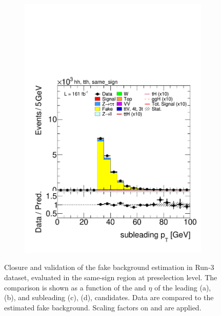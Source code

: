 \begin{figure}[htbp]
\begin{subfigure}[b]{0.45\textwidth}
      \includegraphics[width=\textwidth]{images/fakes_run3/plot_tau_1_pt_hh_tth_22_23_24_same_sign.pdf}
      \caption{}
    \end{subfigure}
  
    \caption{
      Closure and validation of the fake background estimation in Run-3 dataset, evaluated in the same-sign region at preselection level.
      The comparison is shown as a function of the \pt and $\eta$ of the leading (a), (b), and subleading (c), (d), \tauhad candidates. 
      Data are compared to the estimated fake background. Scaling factors on \ztautau and \ttbar are applied.
    }
    \label{fig:closure_validation_run3}
  \end{figure}

